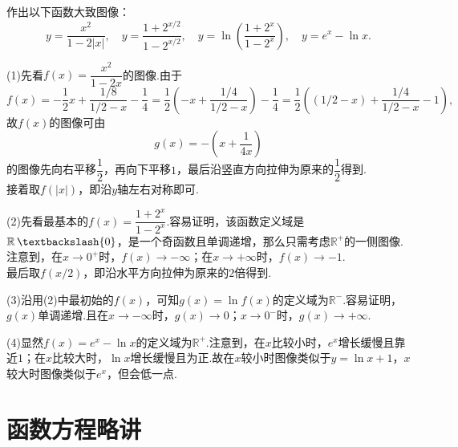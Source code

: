 \documentclass[lang=cn, zihao=5]{elegantbook}
\newcommand{\ssb}[1]{\left( #1 \right)}
\newcommand{\R}{\mathbb{R}}
\DeclareMathOperator{\setjianfa}{\textbackslash}
\begin{document}
\begin{example}
	作出以下函数大致图像：$$y=\frac{x^2}{1-2|x|},\quad y=\frac{1+2^{x/2}}{1-2^{x/2}},\quad y=\ln \ssb{\frac{1+2^x}{1-2^x}},\quad y=e^x-\ln x.$$
\end{example}
\begin{solution}
	(1)先看$f(x)=\dfrac{x^2}{1-2x}$的图像.由于$$f(x)=-\frac{1}{2}x+\frac{1/8}{1/2 - x} - \frac{1}{4} = \frac{1}{2} \ssb{-x+\frac{1/4}{1/2-x}} - \frac{1}{4} = \frac{1}{2} \ssb{(1/2-x)+\frac{1/4}{1/2-x}-1},$$
	故$f(x)$的图像可由$$g(x)=-\ssb{x+\dfrac{1}{4x}}$$
	的图像先向右平移$\dfrac{1}{2}$，再向下平移$1$，最后沿竖直方向拉伸为原来的$\dfrac{1}{2}$得到. \\
	接着取$f(|x|)$，即沿$y$轴左右对称即可.
	\begin{figure}[H]
		\centering
		
	\end{figure}
	
	\noindent
	(2)先看最基本的$f(x)=\dfrac{1+2^x}{1-2^x}$.容易证明，该函数定义域是$\R \setjianfa \{ 0 \}$，是一个奇函数且单调递增，那么只需考虑$\R ^+$的一侧图像.注意到，在$x \to 0^+$时，$f(x) \to -\infty$；在$x \to +\infty$时，$f(x) \to -1$. \\
	最后取$f(x/2)$，即沿水平方向拉伸为原来的$2$倍得到.
	\begin{figure}[H]
		\centering
		
	\end{figure}
	
	\noindent
	(3)沿用(2)中最初始的$f(x)$，可知$g(x)=\ln f(x)$的定义域为$\R ^-$.容易证明，$g(x)$单调递增.且在$x \to -\infty$时，$g(x) \to 0$；$x \to 0^-$时，$g(x) \to +\infty$.
	\begin{figure}[H]
		\centering
		
	\end{figure}
	
	\noindent
	(4)显然$f(x)=e^x-\ln x$的定义域为$\R ^+$.注意到，在$x$比较小时，$e^x$增长缓慢且靠近$1$；在$x$比较大时，$\ln x$增长缓慢且为正.故在$x$较小时图像类似于$y=\ln x+1$，$x$较大时图像类似于$e^x$，但会低一点.
	\begin{figure}[H]
		\centering
		
	\end{figure}
\end{solution}

\newpage
\section{函数方程略讲}
\end{document}
